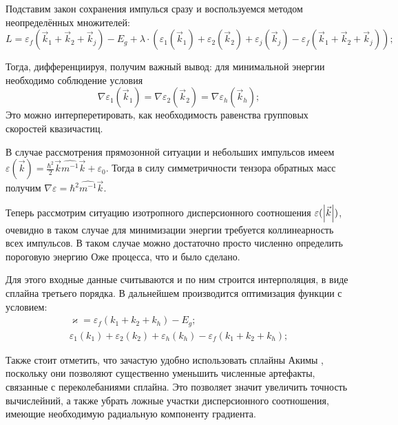 \documentclass[../main.tex]{subfiles}
\begin{document}
        Подставим закон сохранения импулься сразу и воспользуемся методом неопределённых множителей:
        \begin{equation}
            L = \varepsilon_f(\vec{k}_1 + \vec{k}_2 + \vec{k}_j) - E_g + \lambda \cdot \left(\varepsilon_1(\vec{k}_1) + 
            \varepsilon_2(\vec{k}_2) + \varepsilon_j(\vec{k}_j) - \varepsilon_f(\vec{k}_1 + \vec{k}_2 + \vec{k}_j)\right);
        \end{equation}

        Тогда, дифференциируя, получим важный  вывод: для минимальной энергии необходимо соблюдение условия
        \begin{equation}
            \nabla \varepsilon_1(\vec{k}_1) = \nabla \varepsilon_2(\vec{k}_2) = \nabla \varepsilon_h(\vec{k}_h);
        \end{equation}
        Это можно интерперетировать, как необходимость равенства групповых скоростей квазичастиц.
        
        В случае рассмотрения
                прямозонной ситуации и небольших импульсов имеем 
                    $\varepsilon (\vec k) = \frac{\hbar^2}{2} \vec k \widehat{m^{-1}} \vec k + \varepsilon_0$.
                Тогда в силу симметричности тензора обратных масс получим $\nabla \varepsilon = \hbar^2 \widehat{m^{-1}} \vec k$.

        Теперь рассмотрим ситуацию изотропного дисперсионного соотношения $\varepsilon(\abs{\vec k})$,
        очевидно в таком случае для минимизации энергии требуется коллинеарность всех импульсов. 
        В таком случае можно достаточно просто численно определить пороговую энергию Оже процесса, что и было сделано.

        Для этого входные данные считываются и по ним строится интерполяция,
        в виде сплайна третьего порядка. В дальнейшем производится оптимизация функции с условием:
        \begin{eqnarray}
            \varkappa  = \varepsilon_f(k_1 + k_2 + k_h) - E_g;\\
            \varepsilon_1(k_1) + \varepsilon_2(k_2) + \varepsilon_h(k_h) - \varepsilon_f(k_1 + k_2 + k_h);
        \end{eqnarray}

        Также стоит отметить, что зачастую удобно использовать сплайны Акимы \cite{AkimaSplines}, поскольку они позволяют существенно уменьшить
        численные артефакты, связанные с переколебаниями сплайна. Это позволяет значит увеличить точность вычислейний, а также убрать ложные
        участки дисперсионного соотношения, имеющие необходимую радиальную компоненту градиента.
\end{document}
